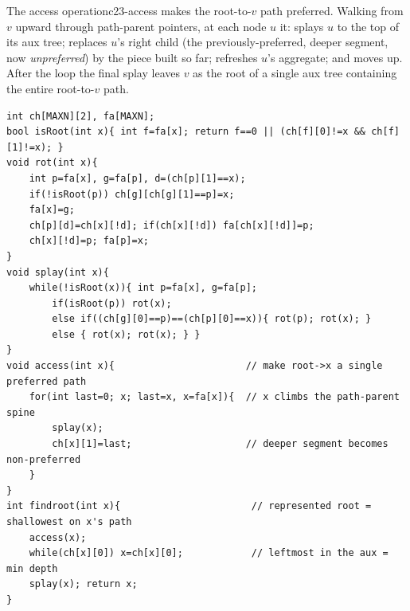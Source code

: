 \begin{definition}{The access operation}{c23-access}
 makes the root-to-\(v\) path preferred. Walking from \(v\) upward
through path-parent pointers, at each node \(u\) it: splays \(u\) to the top of its
aux tree; replaces \(u\)'s right child (the previously-preferred, deeper segment,
now \emph{unpreferred}) by the piece built so far; refreshes \(u\)'s aggregate; and
moves up. After the loop the final splay leaves \(v\) as the root of a single aux
tree containing the entire root-to-\(v\) path.
\end{definition}

\begin{lstlisting}[caption={The LCT core: is-root test, push-up, rotate, splay, access, findroot. Aux children are ls/rs; fa doubles as path-parent for an aux root. NO makeroot/reverse tag in this rooted section. ASCII only}, label={lst:c23-lct-core}]
int ch[MAXN][2], fa[MAXN];
bool isRoot(int x){ int f=fa[x]; return f==0 || (ch[f][0]!=x && ch[f][1]!=x); }
void rot(int x){
    int p=fa[x], g=fa[p], d=(ch[p][1]==x);
    if(!isRoot(p)) ch[g][ch[g][1]==p]=x;
    fa[x]=g;
    ch[p][d]=ch[x][!d]; if(ch[x][!d]) fa[ch[x][!d]]=p;
    ch[x][!d]=p; fa[p]=x;
}
void splay(int x){
    while(!isRoot(x)){ int p=fa[x], g=fa[p];
        if(isRoot(p)) rot(x);
        else if((ch[g][0]==p)==(ch[p][0]==x)){ rot(p); rot(x); }
        else { rot(x); rot(x); } }
}
void access(int x){                       // make root->x a single preferred path
    for(int last=0; x; last=x, x=fa[x]){  // x climbs the path-parent spine
        splay(x);
        ch[x][1]=last;                    // deeper segment becomes non-preferred
    }
}
int findroot(int x){                       // represented root = shallowest on x's path
    access(x);
    while(ch[x][0]) x=ch[x][0];            // leftmost in the aux = min depth
    splay(x); return x;
}
\end{lstlisting}


